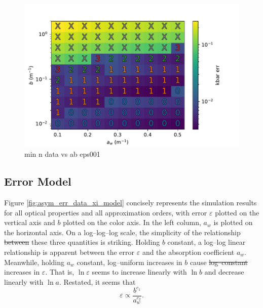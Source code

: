 \documentclass[ms,cpyr,lof,lot]{uathesis}
\providecommand{\DIFadd}[1]{{\protect\color{blue}\uwave{#1}}} %
\providecommand{\DIFdel}[1]{{\protect\color{red}\sout{#1}}}                      %
\providecommand{\DIFaddbegin}{} %
\providecommand{\DIFaddend}{} %
\providecommand{\DIFdelbegin}{} %
\providecommand{\DIFdelend}{} %
\newcommand{\DIFscaledelfig}{0.5}
\newlength{\DIFdelgraphicswidth} %
\newlength{\DIFdelgraphicsheight} %
\newcommand{\DIFaddincludegraphics}[2][]{{\color{blue}\fbox{\DIFOincludegraphics[#1]{#2}}}} %
\newcommand{\DIFdelincludegraphics}[2][]{%
\sbox{\DIFdelgraphicsbox}{\DIFOincludegraphics[#1]{#2}}%
\settoboxwidth{\DIFdelgraphicswidth}{\DIFdelgraphicsbox} %
\settoboxtotalheight{\DIFdelgraphicsheight}{\DIFdelgraphicsbox} %
\scalebox{\DIFscaledelfig}{%
\parbox[b]{\DIFdelgraphicswidth}{\usebox{\DIFdelgraphicsbox}\\[-\baselineskip] \rule{\DIFdelgraphicswidth}{0em}}\llap{\resizebox{\DIFdelgraphicswidth}{\DIFdelgraphicsheight}{%
\setlength{\unitlength}{\DIFdelgraphicswidth}%
\begin{picture}(1,1)%
\thicklines\linethickness{2pt} %
{\color[rgb]{1,0,0}\put(0,0){\framebox(1,1){}}}%
{\color[rgb]{1,0,0}\put(0,0){\line( 1,1){1}}}%
{\color[rgb]{1,0,0}\put(0,1){\line(1,-1){1}}}%
\end{picture}%
}\hspace*{3pt}}} %
} %
\DeclareRobustCommand{\DIFaddbegin}{\DIFOaddbegin \let\includegraphics\DIFaddincludegraphics} %
\DeclareRobustCommand{\DIFaddend}{\DIFOaddend \let\includegraphics\DIFOincludegraphics} %
\DeclareRobustCommand{\DIFdelbegin}{\DIFOdelbegin \let\includegraphics\DIFdelincludegraphics} %
\DeclareRobustCommand{\DIFdelend}{\DIFOaddend \let\includegraphics\DIFOincludegraphics} %
\begin{document}
\begin{figure}[H]
  \centering
  \includegraphics[width=\rdfigwidth]{min_n_data_vs_ab_eps001}
  \caption{min n data vs ab eps001}
  \label{fig:min_n_data_vs_ab_eps001}
\end{figure}

\subsection{Error Model}
Figure \ref{fig:asym_err_data_xi_model} concisely represents the simulation results for all optical properties and all approximation orders, with error $\varepsilon$ plotted on the vertical axis and $b$ plotted on the color axis.
In the left column, $a_w$ is plotted on the horizontal axis.
On a log--log--log scale, the simplicity of the relationship \DIFdelbegin \DIFdel{between }\DIFdelend \DIFaddbegin \DIFadd{among }\DIFaddend these three quantities is striking.
Holding $b$ constant, a log--log linear relationship is apparent between the error $\varepsilon$ and the absorption coefficient $a_w$.
Meanwhile, holding $a_w$ constant, log--uniform increases in $b$ cause \DIFdelbegin \DIFdel{log--constant }\DIFdelend \DIFaddbegin \DIFadd{log--uniform }\DIFaddend increases in $\varepsilon$.
That is, $\ln\varepsilon$ seems to increase linearly with $\ln b$ and decrease linearly with $\ln a$.
Restated, it seems that
\begin{equation}
  \varepsilon \propto \frac{b^{c_1}}{a_w^{c_2}}.
\end{equation}
\end{document}
